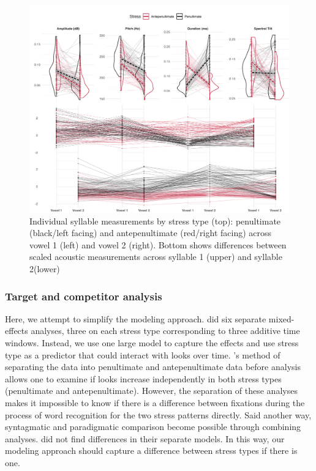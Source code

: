 \begin{figure}[H]
  \centering
  \includegraphics[width=1\linewidth]{visuals/raw_acoustics_combined.jpeg}
  \caption{Individual syllable measurements by stress type (top): penultimate (black/left facing) and antepenultimate (red/right facing)  across vowel 1 (left) and vowel 2 (right). Bottom shows differences between scaled acoustic measurements across syllable 1 (upper) and syllable 2(lower)}
  \label{fig:raw_acoustics}
\end{figure}


\subsubsection{Target and competitor analysis}
Here, we attempt to simplify the modeling approach. \cite{Sulpizio_McQueen_2012} did six separate mixed-effects analyses, three on each stress type corresponding to three additive time windows. Instead, we use one large model to capture the effects and use stress type as a predictor that could interact with looks over time. \cite{Sulpizio_McQueen_2012}'s method of separating the data into penultimate and antepenultimate data before analysis allows one to examine if looks increase independently in both stress types (penultimate and antepenultimate). However, the separation of these analyses makes it impossible to know if there is a difference between fixations during the process of word recognition for the two stress patterns directly. Said another way, syntagmatic and paradigmatic comparison become possible through combining analyses. \cite{Sulpizio_McQueen_2012} did not find differences in their separate models. In this way, our modeling approach should capture a difference between stress types if there is one. 

